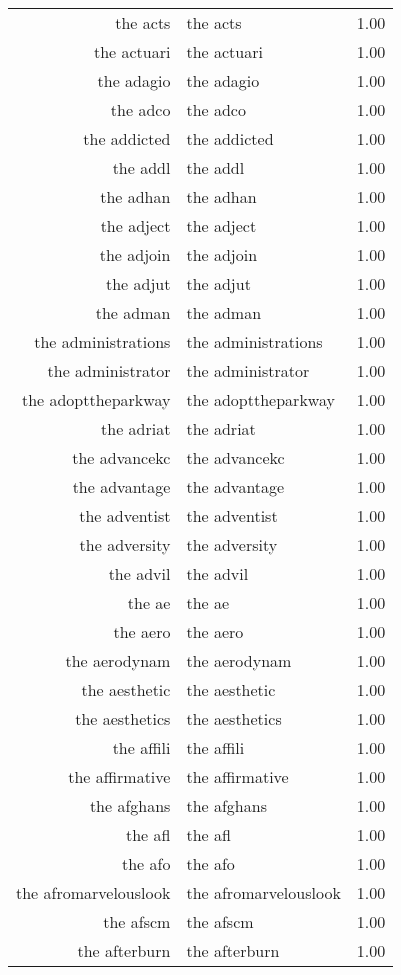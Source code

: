 \begin{table}[ht]
\begin{tabular}{rlr}
  the acts & the acts & 1.00 \\ 
  the actuari & the actuari & 1.00 \\ 
  the adagio & the adagio & 1.00 \\ 
  the adco & the adco & 1.00 \\ 
  the addicted & the addicted & 1.00 \\ 
  the addl & the addl & 1.00 \\ 
  the adhan & the adhan & 1.00 \\ 
  the adject & the adject & 1.00 \\ 
  the adjoin & the adjoin & 1.00 \\ 
  the adjut & the adjut & 1.00 \\ 
  the adman & the adman & 1.00 \\ 
  the administrations & the administrations & 1.00 \\ 
  the administrator & the administrator & 1.00 \\ 
  the adopttheparkway & the adopttheparkway & 1.00 \\ 
  the adriat & the adriat & 1.00 \\ 
  the advancekc & the advancekc & 1.00 \\ 
  the advantage & the advantage & 1.00 \\ 
  the adventist & the adventist & 1.00 \\ 
  the adversity & the adversity & 1.00 \\ 
  the advil & the advil & 1.00 \\ 
  the ae & the ae & 1.00 \\ 
  the aero & the aero & 1.00 \\ 
  the aerodynam & the aerodynam & 1.00 \\ 
  the aesthetic & the aesthetic & 1.00 \\ 
  the aesthetics & the aesthetics & 1.00 \\ 
  the affili & the affili & 1.00 \\ 
  the affirmative & the affirmative & 1.00 \\ 
  the afghans & the afghans & 1.00 \\ 
  the afl & the afl & 1.00 \\ 
  the afo & the afo & 1.00 \\ 
  the afromarvelouslook & the afromarvelouslook & 1.00 \\ 
  the afscm & the afscm & 1.00 \\ 
  the afterburn & the afterburn & 1.00 \\ 

\end{tabular}
\end{table}
